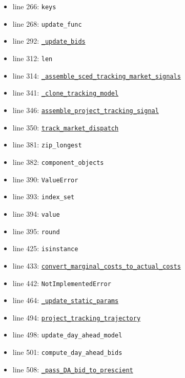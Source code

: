 \documentclass[11pt]{report}
\begin{document}
\begin{itemize}[leftmargin=*]
  \item line 266: \texttt{keys}
  \item line 268: \texttt{update\_func}
  \item line 292: \hyperref[def:coordinator.py:DoubleLoopCoordinator._update_bids:L187]{\texttt{\_update\_bids}}
  \item line 312: \texttt{len}
  \item line 314: \hyperref[def:coordinator.py:DoubleLoopCoordinator._assemble_sced_tracking_market_signals:L683]{\texttt{\_assemble\_sced\_tracking\_market\_signals}}
  \item line 341: \hyperref[def:coordinator.py:DoubleLoopCoordinator._clone_tracking_model:L366]{\texttt{\_clone\_tracking\_model}}
  \item line 346: \hyperref[def:coordinator.py:DoubleLoopCoordinator.assemble_project_tracking_signal:L296]{\texttt{assemble\_project\_tracking\_signal}}
  \item line 350: \hyperref[def:tracker.py:Tracker.track_market_dispatch:L283]{\texttt{track\_market\_dispatch}}
  \item line 381: \texttt{zip\_longest}
  \item line 382: \texttt{component\_objects}
  \item line 390: \texttt{ValueError}
  \item line 393: \texttt{index\_set}
  \item line 394: \texttt{value}
  \item line 395: \texttt{round}
  \item line 425: \texttt{isinstance}
  \item line 433: \hyperref[def:utils.py:convert_marginal_costs_to_actual_costs:L15]{\texttt{convert\_marginal\_costs\_to\_actual\_costs}}
  \item line 442: \texttt{NotImplementedError}
  \item line 464: \hyperref[def:coordinator.py:DoubleLoopCoordinator._update_static_params:L399]{\texttt{\_update\_static\_params}}
  \item line 494: \hyperref[def:coordinator.py:DoubleLoopCoordinator.project_tracking_trajectory:L321]{\texttt{project\_tracking\_trajectory}}
  \item line 498: \texttt{update\_day\_ahead\_model}
  \item line 501: \texttt{compute\_day\_ahead\_bids}
  \item line 508: \hyperref[def:coordinator.py:DoubleLoopCoordinator._pass_DA_bid_to_prescient:L272]{\texttt{\_pass\_DA\_bid\_to\_prescient}}

\end{itemize}
\end{document}
